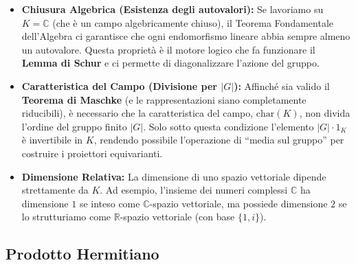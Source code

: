 \begin{itemize}
    \item \textbf{Chiusura Algebrica (Esistenza degli autovalori):} Se lavoriamo su $K = \mathbb{C}$ (che è un campo algebricamente chiuso), il Teorema Fondamentale dell'Algebra ci garantisce che ogni endomorfismo lineare abbia sempre almeno un autovalore. Questa proprietà è il motore logico che fa funzionare il \textbf{Lemma di Schur} e ci permette di diagonalizzare l'azione del gruppo.
    \item \textbf{Caratteristica del Campo (Divisione per $|G|$):} Affinché sia valido il \textbf{Teorema di Maschke} (e le rappresentazioni siano completamente riducibili), è necessario che la caratteristica del campo, $\text{char}(K)$, non divida l'ordine del gruppo finito $|G|$. Solo sotto questa condizione l'elemento $|G| \cdot 1_K$ è invertibile in $K$, rendendo possibile l'operazione di ``media sul gruppo'' per costruire i proiettori equivarianti.
    \item \textbf{Dimensione Relativa:} La dimensione di uno spazio vettoriale dipende strettamente da $K$. Ad esempio, l'insieme dei numeri complessi $\mathbb{C}$ ha dimensione $1$ se inteso come $\mathbb{C}$-spazio vettoriale, ma possiede dimensione $2$ se lo strutturiamo come $\mathbb{R}$-spazio vettoriale (con base $\{1, i\}$).
\end{itemize}

\subsection{Prodotto Hermitiano}

